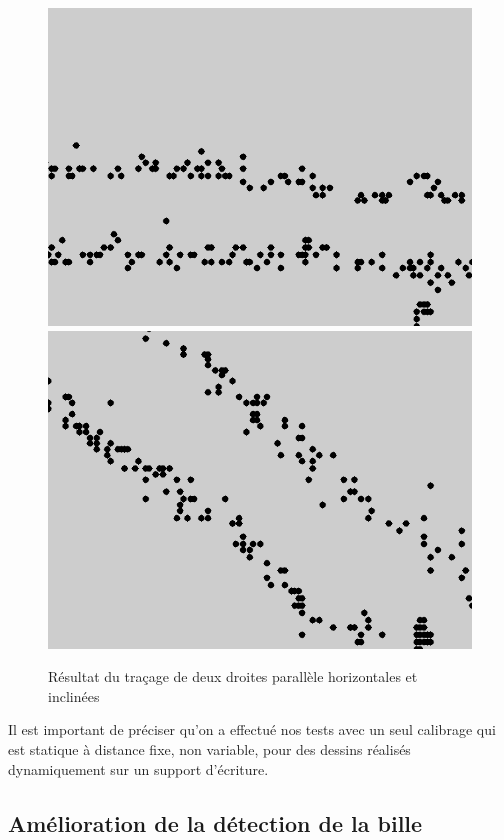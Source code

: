 \documentclass[12pt,a4paper,oneside]{book}
\begin{document}
	\begin{figure}[H]		
		\centering
		\includegraphics[scale=0.45]{A44.png}
		\includegraphics[scale=0.45]{FormatA41.png}
		\caption{Résultat du traçage de deux droites parallèle horizontales et inclinées}
		\label{figb}
	\end{figure}
	
	Il est important de préciser qu'on a effectué nos tests avec un seul calibrage qui est statique à distance fixe, non variable, pour des dessins réalisés dynamiquement sur un support d'écriture.
	
	
	\subsection{Amélioration de la détection de la bille}
	
\end{document}
